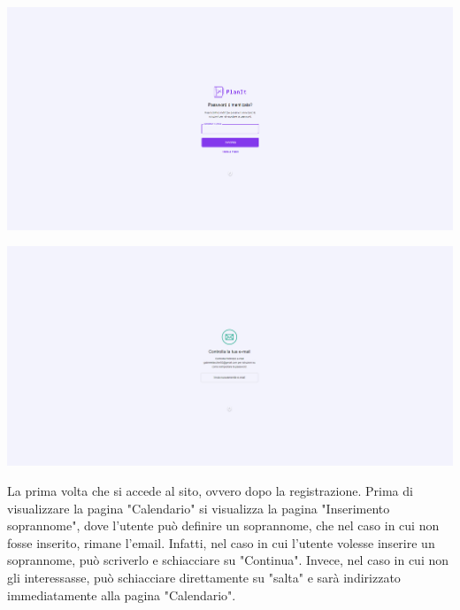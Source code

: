 \begin{center}
    \includegraphics[width=1\textwidth, height=0.3\textheight]{img/png/FrontEnd/Homepage_Autenticazione/recupero_password.png}
\end{center}

\begin{center}
    \includegraphics[width=1\textwidth, height=0.3\textheight]{img/png/FrontEnd/Homepage_Autenticazione/controlla_email.png}
\end{center}

La prima volta che si accede al sito, ovvero dopo la registrazione. Prima di visualizzare la pagina "Calendario" si visualizza la pagina "Inserimento soprannome", dove l'utente può definire un soprannome, che nel caso in cui non fosse inserito, rimane l'email. Infatti, nel caso in cui l'utente volesse inserire un soprannome, può scriverlo e schiacciare su "Continua". Invece, nel caso in cui non gli interessasse, può schiacciare direttamente su "salta" e sarà indirizzato immediatamente alla pagina "Calendario".

